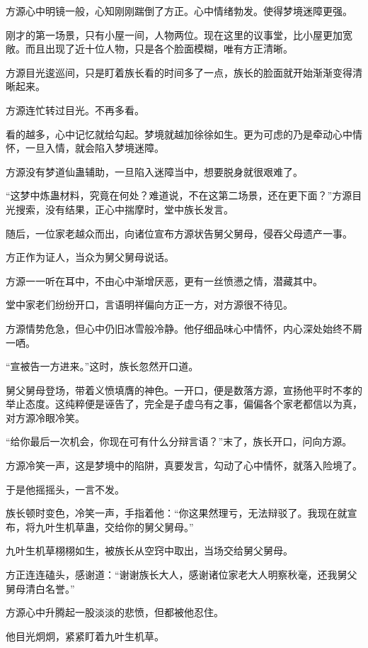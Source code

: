 \begin{this_body}
方源心中明镜一般，心知刚刚踹倒了方正。心中情绪勃发。使得梦境迷障更强。

刚才的第一场景，只有小屋一间，人物两位。现在这里的议事堂，比小屋更加宽敞。而且出现了近十位人物，只是各个脸面模糊，唯有方正清晰。

方源目光逡巡间，只是盯着族长看的时间多了一点，族长的脸面就开始渐渐变得清晰起来。

方源连忙转过目光。不再多看。

看的越多，心中记忆就给勾起。梦境就越加徐徐如生。更为可虑的乃是牵动心中情怀，一旦入情，就会陷入梦境迷障。

方源没有梦道仙蛊辅助，一旦陷入迷障当中，想要脱身就很艰难了。

“这梦中炼蛊材料，究竟在何处？难道说，不在这第二场景，还在更下面？”方源目光搜索，没有结果，正心中揣摩时，堂中族长发言。

随后，一位家老越众而出，向诸位宣布方源状告舅父舅母，侵吞父母遗产一事。

方正作为证人，当众为舅父舅母说话。

方源一一听在耳中，不由心中渐增厌恶，更有一丝愤懑之情，潜藏其中。

堂中家老们纷纷开口，言语明祥偏向方正一方，对方源很不待见。

方源情势危急，但心中仍旧冰雪般冷静。他仔细品味心中情怀，内心深处始终不屑一哂。

“宣被告一方进来。”这时，族长忽然开口道。

舅父舅母登场，带着义愤填膺的神色。一开口，便是数落方源，宣扬他平时不孝的举止态度。这纯粹便是诬告了，完全是子虚乌有之事，偏偏各个家老都信以为真，对方源冷眼冷笑。

“给你最后一次机会，你现在可有什么分辩言语？”末了，族长开口，问向方源。

方源冷笑一声，这是梦境中的陷阱，真要发言，勾动了心中情怀，就落入险境了。

于是他摇摇头，一言不发。

族长顿时变色，冷笑一声，手指着他：“你这果然理亏，无法辩驳了。我现在就宣布，将九叶生机草蛊，交给你的舅父舅母。”

九叶生机草栩栩如生，被族长从空窍中取出，当场交给舅父舅母。

方正连连磕头，感谢道：“谢谢族长大人，感谢诸位家老大人明察秋毫，还我舅父舅母清白名誉。”

方源心中升腾起一股淡淡的悲愤，但都被他忍住。

他目光炯炯，紧紧盯着九叶生机草。


\end{this_body}
